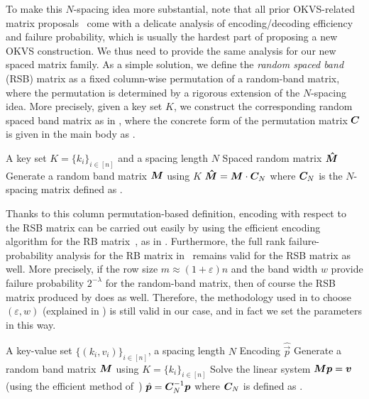 To make this $N$-spacing idea more substantial, note that all prior OKVS-related matrix proposals~\cite{PRTY20,GPR+21,RR22,BPSY23} come with a delicate analysis of encoding/decoding efficiency and failure probability, which is usually the hardest part of proposing a new OKVS construction. We thus need to provide the same analysis for our new spaced matrix family. 
As a simple solution, we define the \emph{random spaced band} (RSB) matrix as a fixed column-wise permutation of a random-band matrix, where the permutation is determined by a rigorous extension of the $N$-spacing idea. More precisely, given a key set $K$, we construct the corresponding random spaced band matrix as in , where the concrete form of the permutation matrix $\bm{C}$ is given in the main body as .

\begin{algorithm}[htbp]
\caption{\textsf{RSB-OKVS.GenMat}}
\begin{algorithmic}[1]
\Input A key set $K = \{k_i\}_{i \in [n]}$ and a spacing length $N$
\Output Spaced random matrix $\bm{\hat{M}}$
\State Generate a random band matrix $\bm{M}$ using $K$
\State \Return $\bm{\hat{M}}=\bm{M} \cdot \bm{C}_N$ where $\bm{C}_N$ is the $N$-spacing matrix defined as .
\end{algorithmic}\label{alg:RSB matrix generato}
\end{algorithm}

Thanks to this column permutation-based definition, encoding with respect to the RSB matrix can be carried out easily by using the efficient encoding algorithm for the RB matrix~\cite{BPSY23}, as in . Furthermore, the full rank failure-probability analysis for the RB matrix in~\cite{BPSY23} remains valid for the RSB matrix as well. More precisely, if the row size $m\approx(1+\varepsilon) n$ and the band width $w$ provide failure probability $2^{-\lambda}$ for the random-band matrix, then of course the RSB matrix produced by  does as well. Therefore, the methodology used in \cite{BPSY23} to choose $(\varepsilon,w)$ (explained in ) is still valid in our case, and in fact we set the parameters in this way.

\begin{algorithm}[htbp]
\caption{\textsf{RSB-OKVS.Encode}}
\begin{algorithmic}[1]
\Input A key-value set $\{(k_i, v_i)\}_{i \in [n]}$, a spacing length $N$
\Output Encoding $\hat{\vec p}$
\State Generate a random band matrix $\bm{M}$ using $K = \{k_i\}_{i \in [n]}$
\State Solve the linear system $\bm{M}\bm{p} = \bm{v}$ (using the efficient method of~\cite{BPSY23})
\State \Return $\hat{\bm{p}}=\bm{C}_N^{-1} \bm{p}$ where $\bm{C}_N$ is defined as .
\end{algorithmic}\label{alg:RSBEncoding}
\end{algorithm}

